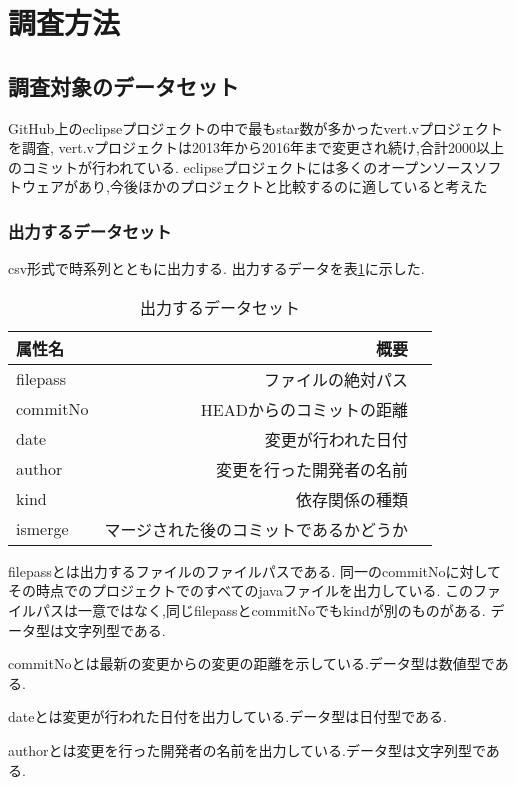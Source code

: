 \documentclass[submit,ses,noauthor]{ipsj} %
\begin{document}
\section{調査方法}\label{調査方法}


\subsection{調査対象のデータセット}
GitHub上のeclipseプロジェクトの中で最もstar数が多かったvert.vプロジェクトを調査,
vert.vプロジェクトは2013年から2016年まで変更され続け,合計2000以上のコミットが行われている.
eclipseプロジェクトには多くのオープンソースソフトウェアがあり,今後ほかのプロジェクトと比較するのに適していると考えた


\subsubsection{出力するデータセット}
csv形式で時系列とともに出力する.
出力するデータを表\ref{tab:初期データセット}に示した.


\begin{table}[htb]
\caption{出力するデータセット}
\begin{tabular}{|l|r|r|} \hline
属性名 & 概要 \\ \hline
filepass & ファイルの絶対パス \\ \hline
commitNo & HEADからのコミットの距離 \\ \hline
date & 変更が行われた日付 \\ \hline
author & 変更を行った開発者の名前 \\ \hline
kind & 依存関係の種類 \\ \hline
ismerge & マージされた後のコミットであるかどうか \\ \hline
\end{tabular}
\label{tab:初期データセット}
\end{table}

filepassとは出力するファイルのファイルパスである.
同一のcommitNoに対してその時点でのプロジェクトでのすべてのjavaファイルを出力している.
このファイルパスは一意ではなく,同じfilepassとcommitNoでもkindが別のものがある.
データ型は文字列型である.

commitNoとは最新の変更からの変更の距離を示している.データ型は数値型である.

dateとは変更が行われた日付を出力している.データ型は日付型である.

authorとは変更を行った開発者の名前を出力している.データ型は文字列型である.
\end{document}
